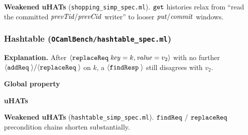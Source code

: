 \textbf{Weakened uHATs} (\texttt{shopping\_simp\_spec.ml}).
\(\boldsymbol{{\tt get}}\) histories relax from ``read the committed \(\mathit{prevTid}/\mathit{prevCid}\) writer'' to looser \(\mathit{put}/\mathit{commit}\) windows.

\subsubsection*{Hashtable (\texttt{OCamlBench/hashtable\_spec.ml})}
\textbf{Explanation.}
After \({\langle} {\boldsymbol{{\tt replaceReq}}\;{\mathit{key}=k,\mathit{value}=v_2}} {\rangle}\) with no further \({\langle} {\boldsymbol{{\tt addReq}}\;{}} {\rangle}/{\langle} {\boldsymbol{{\tt replaceReq}}\;{}} {\rangle}\) on \(k\), a \({\langle} {\boldsymbol{{\tt findResp}}\;{}} {\rangle}\) still disagrees with \(v_2\).

\textbf{Global property}
\vspace{-.35cm}\par{}
\vspace{-.4cm}\par\nobreak\noindent
\textbf{uHATs}
\vspace{-.35cm}\par{}
\vspace{-.4cm}\par\nobreak\noindent
\textbf{Weakened uHATs} (\texttt{hashtable\_simp\_spec.ml}).
\(\boldsymbol{{\tt findReq}}\) / \(\boldsymbol{{\tt replaceReq}}\) precondition chains shorten substantially.

